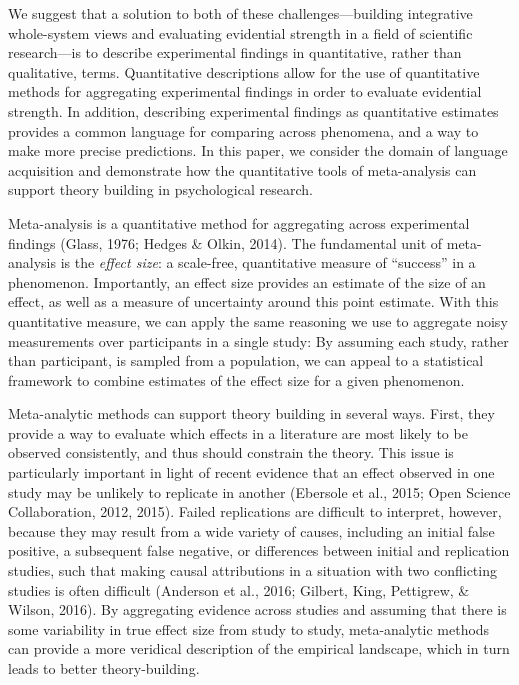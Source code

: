 \documentclass[9pt,twocolumn,twoside,lineno]{pnas-new}
\begin{document}
We suggest that a solution to both of these challenges---building
integrative whole-system views and evaluating evidential strength in a
field of scientific research---is to describe experimental findings in
quantitative, rather than qualitative, terms. Quantitative descriptions
allow for the use of quantitative methods for aggregating experimental
findings in order to evaluate evidential strength. In addition,
describing experimental findings as quantitative estimates provides a
common language for comparing across phenomena, and a way to make more
precise predictions. In this paper, we consider the domain of language
acquisition and demonstrate how the quantitative tools of meta-analysis
can support theory building in psychological research.

Meta-analysis is a quantitative method for aggregating across
experimental findings (Glass, 1976; Hedges \& Olkin, 2014). The
fundamental unit of meta-analysis is the \emph{effect size}: a
scale-free, quantitative measure of \enquote{success} in a phenomenon.
Importantly, an effect size provides an estimate of the size of an
effect, as well as a measure of uncertainty around this point estimate.
With this quantitative measure, we can apply the same reasoning we use
to aggregate noisy measurements over participants in a single study: By
assuming each study, rather than participant, is sampled from a
population, we can appeal to a statistical framework to combine
estimates of the effect size for a given phenomenon.

Meta-analytic methods can support theory building in several ways.
First, they provide a way to evaluate which effects in a literature are
most likely to be observed consistently, and thus should constrain the
theory. This issue is particularly important in light of recent evidence
that an effect observed in one study may be unlikely to replicate in
another (Ebersole et al., 2015; Open Science Collaboration, 2012, 2015).
Failed replications are difficult to interpret, however, because they
may result from a wide variety of causes, including an initial false
positive, a subsequent false negative, or differences between initial
and replication studies, such that making causal attributions in a
situation with two conflicting studies is often difficult (Anderson et
al., 2016; Gilbert, King, Pettigrew, \& Wilson, 2016). By aggregating
evidence across studies and assuming that there is some variability in
true effect size from study to study, meta-analytic methods can provide
a more veridical description of the empirical landscape, which in turn
leads to better theory-building.
\end{document}
